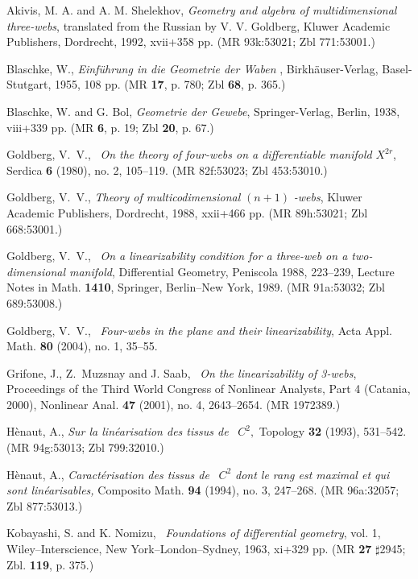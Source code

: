 \documentclass{article}
\begin{document}
\begin{thebibliography}{99}
 Akivis, M. A. and A. M. Shelekhov, \emph{Geometry and
algebra of multidimensional three-webs}, translated from the Russian by V.
V. Goldberg, Kluwer Academic Publishers, Dordrecht, 1992, xvii+358 pp. (MR
93k:53021; Zbl 771:53001.)

 Blaschke, W., \emph{Einf\"{u}hrung in die Geometrie der Waben}%
, Birkh\"{a}user-Verlag, Basel-Stutgart, 1955, 108 pp. (MR \textbf{17}, p.
780; Zbl \textbf{68}, p. 365.)

 Blaschke, W. and G. Bol, \emph{Geometrie der Gewebe},
Springer-Verlag, Berlin, 1938, viii+339 pp. (MR \textbf{6}, p. 19; Zbl
\textbf{20}, p. 67.)

 Goldberg, V.~V., \ \emph{On the theory of four-webs on a
differentiable manifold }$X^{2r}$, Serdica \textbf{6} (1980), no. 2,
105--119. (MR 82f:53023; Zbl 453:53010.)

 Goldberg, V.~V., \emph{Theory of multicodimensional }$(n+1)$%
\emph{-webs}, Kluwer Academic Publishers, Dordrecht, 1988, xxii+466 pp. (MR
89h:53021; Zbl 668:53001.)

 Goldberg, V.~V., \ \emph{On a linearizability condition for a
three-web on a two-dimensional manifold}, Differential Geometry, Peniscola
1988, 223--239, Lecture Notes in Math. \textbf{1410}, Springer, Berlin--New
York, 1989. (MR 91a:53032; Zbl 689:53008.)

 Goldberg, V.~V., \ \emph{Four-webs in the plane and their
linearizability}, Acta Appl. Math. \textbf{80} (2004), no. 1, 35--55.

 Grifone, J., Z.\ Muzsnay and J. Saab, \ \emph{On the
linearizability of 3-webs}, Proceedings of the Third World Congress of
Nonlinear Analysts, Part 4 (Catania, 2000), Nonlinear Anal. \textbf{47}
(2001), no. 4, 2643--2654. (MR 1972389.)

 H\`{e}naut, A., \emph{Sur la lin\'{e}arisation des tissus de}
\ $C^{2},$ Topology \textbf{32} (1993), 531--542. (MR 94g:53013; Zbl
799:32010.)

 H\`{e}naut, A., \emph{Caract\'{e}risation des tissus de} \ $%
C^{2}$ \emph{dont le rang est maximal et qui sont lin\'{e}arisables,}
Composito Math. \textbf{94} (1994), no. 3, 247--268. (MR 96a:32057; Zbl
877:53013.)

 Kobayashi, S. and K. Nomizu, \emph{\ Foundations of
differential geometry}, vol. 1, Wiley--Interscience, New
York--London--Sydney, 1963, xi+329 pp. (MR \textbf{27} $\sharp $2945; Zbl.
\textbf{119}, p. 375.)


\end{thebibliography}
\end{document}
